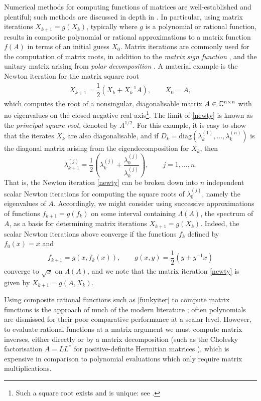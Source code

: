 Numerical methods for computing functions of matrices are well-established and plentiful; such methods are discussed in depth in \cite{Higham}. In particular, using matrix iterations $X_{k+1}=g(X_k)$, typically where $g$ is a polynomial or rational function, results in composite polynomial or rational approximations to a matrix function $f(A)$ in terms of an initial guess $X_0$. Matrix iterations are commonly used for the computation of matrix roots, in addition to the \textit{matrix sign function} \cite{kenney,soleymani2014approximating,soleymani2014some}, and the unitary matrix arising from \textit{polar decomposition} \cite{YujiZolotFreund}. A material example is the Newton iteration for the matrix square root \cite{highamsqrt}
\begin{align}
    X_{k+1}=\dfrac{1}{2}(X_k + X_k^{-1}A), \qquad X_0=A, \label{newty}
\end{align}
which computes the root of a nonsingular, diagonalisable matrix $A \in \mathbb{C}^{n\times n}$ with no eigenvalues on the closed negative real axis\footnote{Such a square root exists and is unique: see \cite[Theorem 1.29]{Higham}.}. The limit of \eqref{newty} is known as the \textit{principal square root}, denoted by $A^{1/2}$. For this example, it is easy to show that the iterates $X_k$ are also diagonalisable, and if $D_k=\text{diag}(\lambda_k^{(1)},\dots,\lambda_k^{(n)})$ is the diagonal matrix arising from the eigendecomposition for $X_k$, then
\[\lambda_{k+1}^{(j)}=\dfrac{1}{2}\left(\lambda_k^{(j)}+\dfrac{\lambda_0^{(j)}}{\lambda_k^{(j)}}\right), \qquad j=1,\dots,n.\]
That is, the Newton iteration \eqref{newty} can be broken down into $n$ independent scalar Newton iterations for computing the square roots of $\lambda_0^{(j)}$, namely the eigenvalues of $A$. Accordingly, we might consider using successive approximations of functions $f_{k+1}=g(f_k)$ on some interval containing $\Lambda(A)$, the spectrum of $A$, as a basis for determining matrix iterations $X_{k+1}=g(X_k)$. Indeed, the scalar Newton iterations above converge if the functions $f_k$ defined by $f_0(x) = x$ and
\begin{align}
   f_{k+1}=g(x,f_k(x)),\qquad g(x,y)=\dfrac{1}{2}\left(y+y^{-1}x\right)\label{funkyiter}
\end{align}
converge to $\sqrt{x}$ on $\Lambda(A)$, and we note that the matrix iteration \eqref{newty} is given by $X_{k+1}=g(A,X_k)$. 

\bigskip{}

Using composite rational functions such as \eqref{funkyiter} to compute matrix functions is the approach of much of the modern literature \cite{Gawlik,ZolotGawlik,yujihighamstable}; often polynomials are dismissed for their poor comparative performance at a scalar level. However, to evaluate rational functions at a matrix argument we must compute matrix inverses, either directly or by a matrix decomposition (such as the Cholesky factorisation $A=LL^*$ for positive-definite Hermitian matrices \cite{cholesky}), which is expensive in comparison to polynomial evaluations which only require matrix multiplications.

